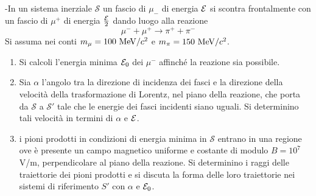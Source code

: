 \documentclass[12pt,twoside,a4]{article}
\begin{document}
\newpage
\begin{esercizio}[Esame 19/02/2015]
	-In un sistema inerziale $\mathcal{S}$ un fascio di $\mu_-$ di energia $\mathcal{E}$ si scontra frontalmente con un fascio di $\mu^+$ di energia $\frac{\mathcal{E}}{2}$ dando luogo alla reazione
$$ \mu^- + \mu^+ \longrightarrow \pi^+ + \pi^- $$
Si assuma nei conti $m_\mu =  100 \ \mev/c^2$ e $m_\pi = 150 \ \mev/c^2$. 
\begin{enumerate}[label=(\textit{\roman*})]
\item Si calcoli l'energia minima $\mathcal{E}_0$ dei $\mu^-$ affinché la reazione sia possibile.
\item Sia $\alpha$ l'angolo tra la direzione di incidenza dei fasci e la direzione della velocità  della trasformazione di Lorentz, nel piano della reazione, che porta da $\mathcal{S}$ a $\mathcal{S}'$ tale che le energie dei fasci incidenti siano uguali. Si determinino tali velocità  in termini di $\alpha$ e $\mathcal{E}$.
\item i pioni prodotti in condizioni di energia minima in $\mathcal{S}$ entrano in una regione ove è presente un campo magnetico uniforme e costante di modulo $B = 10^7$ V/m, perpendicolare al piano della reazione. Si determinino i raggi delle traiettorie dei pioni prodotti e si discuta la forma delle loro traiettorie nei sistemi di riferimento $S'$ con $\alpha$ e $\mathcal{E}_0$. 
\end{enumerate}
\end{esercizio}

\end{document}
